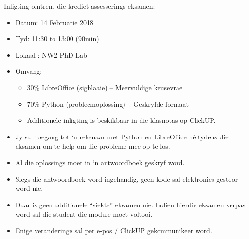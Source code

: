     \noindent
    Inligting omtrent die krediet assesserings eksamen:
    \begin{itemize}
        \item Datum: 14 Februarie 2018
        \item Tyd: 11:30 to 13:00 (90min)
        \item Lokaal : NW2 PhD Lab
        \item Omvang:
        \begin{itemize}
            \item 30\% LibreOffice (sigblaaie) -- Meervuldige keusevrae
            \item 70\% Python (probleemoplossing) -- Geskryfde formaat
            \item Additionele inligting is beskikbaar in die klasnotas op
                ClickUP.
        \end{itemize}
        \item Jy sal toegang tot `n rekenaar met Python en LibreOffice h\^e
            tydens die eksamen om te help om die probleme mee op te los.
        \item Al die oplossings moet in `n antwoordboek geskryf word.
        \item Slegs die antwoordboek word ingehandig, geen kode sal elektronies
            gestoor word nie.
        \item Daar is geen additionele ``siekte'' eksamen nie. Indien hierdie
            eksamen verpas word sal die student die module moet voltooi.
        \item Enige veranderinge sal per e-pos / ClickUP gekommunikeer word.
    \end{itemize}

